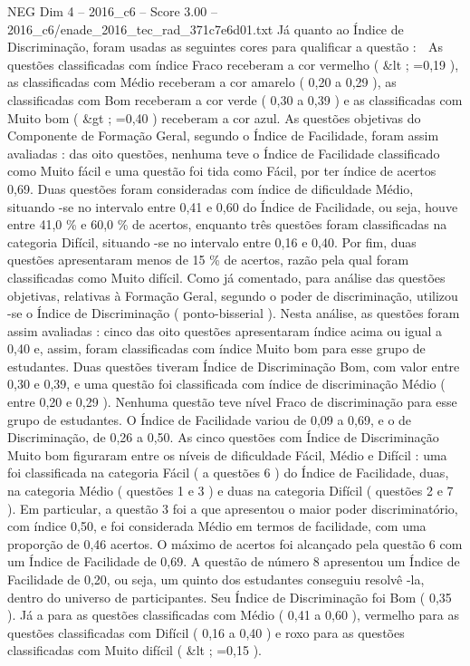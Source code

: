 \begin{textsample}{NEG Dim 4 – 2016\_c6 – Score 3.00 – 2016\_c6/enade\_2016\_tec\_rad\_371c7e6d01.txt}
Já quanto ao Índice de Discriminação, foram usadas as seguintes cores para qualificar a questão :  As questões classificadas com índice Fraco receberam a cor vermelho ( \&lt ; =0,19 ), as classificadas com Médio receberam a cor amarelo ( 0,20 a 0,29 ), as classificadas com Bom receberam a cor verde ( 0,30 a 0,39 ) e as classificadas com Muito bom ( \&gt ; =0,40 ) receberam a cor azul.
As questões objetivas do Componente de Formação Geral, segundo o Índice de Facilidade, foram assim avaliadas : das oito questões, nenhuma teve o Índice de Facilidade classificado como Muito fácil e uma questão foi tida como Fácil, por ter índice de acertos 0,69.
Duas questões foram consideradas com índice de dificuldade Médio, situando -se no intervalo entre 0,41 e 0,60 do Índice de Facilidade, ou seja, houve entre 41,0 \% e 60,0 \% de acertos, enquanto três questões foram classificadas na categoria Difícil, situando -se no intervalo entre 0,16 e 0,40.
Por fim, duas questões apresentaram menos de 15 \% de acertos, razão pela qual foram classificadas como Muito difícil.
Como já comentado, para análise das questões objetivas, relativas à Formação Geral, segundo o poder de discriminação, utilizou -se o Índice de Discriminação ( ponto-bisserial ).
Nesta análise, as questões foram assim avaliadas : cinco das oito questões apresentaram índice acima ou igual a 0,40 e, assim, foram classificadas com índice Muito bom para esse grupo de estudantes.
Duas questões tiveram Índice de Discriminação Bom, com valor entre 0,30 e 0,39, e uma questão foi classificada com índice de discriminação Médio ( entre 0,20 e 0,29 ).
Nenhuma questão teve nível Fraco de discriminação para esse grupo de estudantes.
O Índice de Facilidade variou de 0,09 a 0,69, e o de Discriminação, de 0,26 a 0,50.
As cinco questões com Índice de Discriminação Muito bom figuraram entre os níveis de dificuldade Fácil, Médio e Difícil : uma foi classificada na categoria Fácil ( a questões 6 ) do Índice de Facilidade, duas, na categoria Médio ( questões 1 e 3 ) e duas na categoria Difícil ( questões 2 e 7 ).
Em particular, a questão 3 foi a que apresentou o maior poder discriminatório, com índice 0,50, e foi considerada Médio em termos de facilidade, com uma proporção de 0,46 acertos.
O máximo de acertos foi alcançado pela questão 6 com um Índice de Facilidade de 0,69.
A questão de número 8 apresentou um Índice de Facilidade de 0,20, ou seja, um quinto dos estudantes conseguiu resolvê -la, dentro do universo de participantes.
Seu Índice de Discriminação foi Bom ( 0,35 ).
Já a para as questões classificadas com Médio ( 0,41 a 0,60 ), vermelho para as questões classificadas com Difícil ( 0,16 a 0,40 ) e roxo para as questões classificadas com Muito difícil ( \&lt ; =0,15 ).

\end{textsample}
